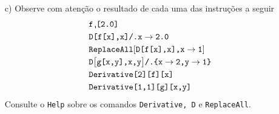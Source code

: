 \documentclass[11pt]{article}
\begin{document}
\begin{itemize}
\item[c)]  Observe com aten\c{c}\~ao o resultado de cada uma das instru\c{c}\~oes a seguir
 \[\begin{array}{l}
\texttt{f}\texttt{\char"0D}\!\texttt{[2.0]}
\vspace{1mm}\\\texttt{D[f[x],x]/.x} \rightarrow \texttt{2.0}
\vspace{1mm}\\ 
\texttt{ReplaceAll}[\texttt{D[f[x],x],x} \rightarrow \texttt{1}]\vspace{1mm}\\ 
\texttt{D\big[g[x,y],x,y\big]/.\{x}\rightarrow\texttt{2,y}\rightarrow\texttt{1\}}
\vspace{1mm}\\ 
\texttt{Derivative[2][f][x]}\vspace{1mm}\\ 
\texttt{Derivative[1,1][g][x,y]}
\end{array}
\]
Consulte o \texttt{Help} sobre os comandos \texttt{Derivative, D} e \texttt{ReplaceAll}. 



\end{itemize} 
\end{document}
